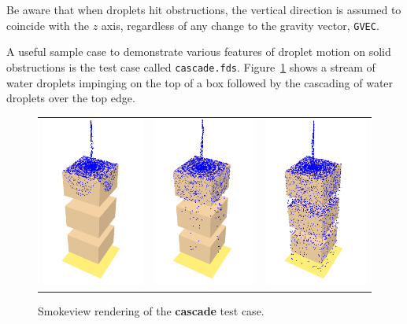 \documentclass[11pt]{book}
\newcommand{\ct}{\tt\small}
\begin{document}
\begin{warning}
Be aware that when droplets hit obstructions, the vertical direction is assumed to coincide with the $z$ axis, regardless of any change to the gravity vector, {\ct GVEC}.
\end{warning}

\noindent
A useful sample case to demonstrate various features of droplet motion on solid obstructions is the test case called {\ct cascade.fds}. Figure~\ref{cascade} shows a stream
of water droplets impinging on the top of a box followed by the cascading of water droplets over the top edge.

\begin{figure}[ht]
\begin{center}
\begin{tabular}{lcr}
\includegraphics[height=2.2in]{SCRIPT_FIGURES/cascade_1} &
\includegraphics[height=2.2in]{SCRIPT_FIGURES/cascade_2} &
\includegraphics[height=2.2in]{SCRIPT_FIGURES/cascade_3}
\end{tabular}
\end{center}
\caption[Example of water cascading over solid obstructions.]{Smokeview rendering of the {\bf cascade} test case.}
\label{cascade}
\end{figure}
\end{document}
